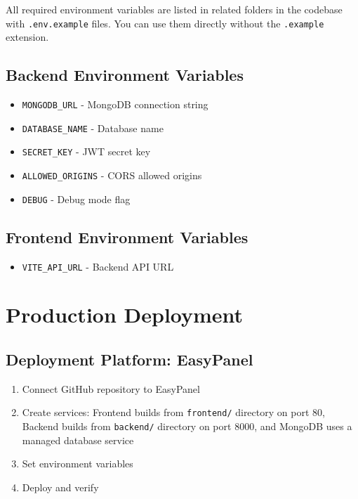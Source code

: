 \documentclass[12pt,a4paper]{report}
\begin{document}
All required environment variables are listed in related folders in the codebase with \texttt{.env.example} files. You can use them directly without the \texttt{.example} extension.

\subsection{Backend Environment Variables}

\begin{itemize}
    \item \texttt{MONGODB\_URL} - MongoDB connection string
    \item \texttt{DATABASE\_NAME} - Database name
    \item \texttt{SECRET\_KEY} - JWT secret key
    \item \texttt{ALLOWED\_ORIGINS} - CORS allowed origins
    \item \texttt{DEBUG} - Debug mode flag
\end{itemize}

\subsection{Frontend Environment Variables}

\begin{itemize}
    \item \texttt{VITE\_API\_URL} - Backend API URL
\end{itemize}

\section{Production Deployment}

\subsection{Deployment Platform: EasyPanel}

\begin{enumerate}
    \item Connect GitHub repository to EasyPanel
    \item Create services: Frontend builds from \texttt{frontend/} directory on port 80, Backend builds from \texttt{backend/} directory on port 8000, and MongoDB uses a managed database service

    \item Set environment variables

    \item Deploy and verify
\end{enumerate}
\end{document}

